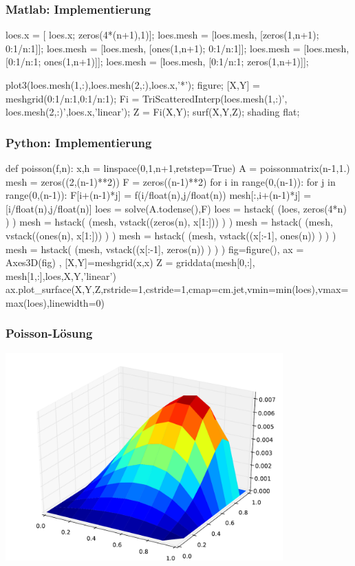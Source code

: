 \documentclass[hyperref={xetex}]{beamer}
\begin{document}
%
% 
\begin{frame}[fragile]\frametitle{Matlab: Implementierung}
\begin{matlabin}

loes.x = [ loes.x; zeros(4*(n+1),1)];
loes.mesh = [loes.mesh, [zeros(1,n+1); 0:1/n:1]];
loes.mesh = [loes.mesh, [ones(1,n+1);  0:1/n:1]];
loes.mesh = [loes.mesh, [0:1/n:1; ones(1,n+1)]];
loes.mesh = [loes.mesh, [0:1/n:1; zeros(1,n+1)]];

plot3(loes.mesh(1,:),loes.mesh(2,:),loes.x,'*');
figure;
[X,Y] = meshgrid(0:1/n:1,0:1/n:1);
Fi = TriScatteredInterp(loes.mesh(1,:)', loes.mesh(2,:)',loes.x,'linear');
Z = Fi(X,Y);
surf(X,Y,Z); shading flat;
\end{matlabin}
\end{frame}

\begin{frame}[fragile]\frametitle{Python: Implementierung}
  \begin{pyin}
def poisson(f,n):
    x,h = linspace(0,1,n+1,retstep=True)
    A = poissonmatrix(n-1,1.) 
    mesh = zeros((2,(n-1)**2))
    F = zeros((n-1)**2)
    for i in range(0,(n-1)):
        for j in range(0,(n-1)):
            F[i+(n-1)*j] = f(i/float(n),j/float(n))
            mesh[:,i+(n-1)*j] = [i/float(n),j/float(n)]
    loes = solve(A.todense(),F)
    loes = hstack( (loes, zeros(4*n) ) ) 
    mesh = hstack( (mesh, vstack((zeros(n), x[1:])) ) )
    mesh = hstack( (mesh, vstack((ones(n), x[1:])) ) )
    mesh = hstack( (mesh, vstack((x[:-1], ones(n)) ) ) )
    mesh = hstack( (mesh, vstack((x[:-1], zeros(n)) ) ) )
    fig=figure(), ax = Axes3D(fig) , [X,Y]=meshgrid(x,x)
    Z = griddata(mesh[0,:], mesh[1,:],loes,X,Y,'linear')
    ax.plot_surface(X,Y,Z,rstride=1,cstride=1,cmap=cm.jet,vmin=min(loes),vmax=max(loes),linewidth=0)
  \end{pyin}
\end{frame}

\begin{frame}[fragile]\frametitle{Poisson-Lösung}
\begin{center}
\includegraphics[width=0.8\textwidth]{./figures/poisson} 
\end{center}
\end{frame}
\end{document}
